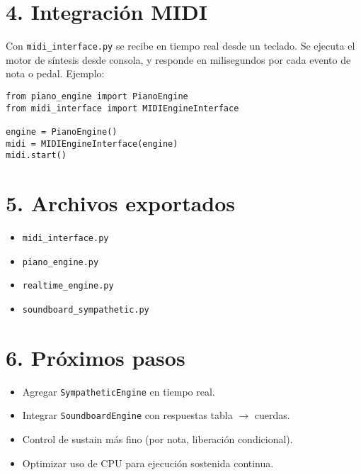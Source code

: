 \documentclass[12pt]{article}
\begin{document}
\section{4. Integración MIDI}
Con \texttt{midi\_interface.py} se recibe en tiempo real desde un teclado. Se ejecuta el motor de síntesis desde consola, y responde en milisegundos por cada evento de nota o pedal. Ejemplo:

\begin{verbatim}
from piano_engine import PianoEngine
from midi_interface import MIDIEngineInterface

engine = PianoEngine()
midi = MIDIEngineInterface(engine)
midi.start()
\end{verbatim}

\section{5. Archivos exportados}
\begin{itemize}
  \item \texttt{midi\_interface.py}
  \item \texttt{piano\_engine.py}
  \item \texttt{realtime\_engine.py}
  \item \texttt{soundboard\_sympathetic.py}
\end{itemize}

\section{6. Próximos pasos}
\begin{itemize}
  \item Agregar \texttt{SympatheticEngine} en tiempo real.
  \item Integrar \texttt{SoundboardEngine} con respuestas tabla $\rightarrow$ cuerdas.
  \item Control de sustain más fino (por nota, liberación condicional).
  \item Optimizar uso de CPU para ejecución sostenida continua.
\end{itemize}
\end{document}
